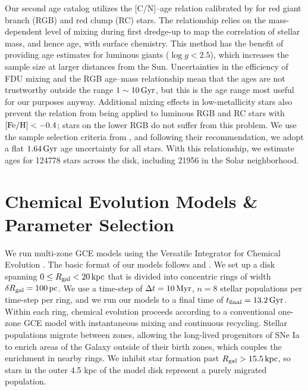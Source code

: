 \documentclass[twocolumn,twocolappendix,linenumbers]{aastex631}
\newcommand{\mathFeH}{{\rm [Fe/H]}}
\newcommand{\kpc}{\,{\rm kpc}}
\newcommand{\Gyr}{\,{\rm Gyr}}
\begin{document}
Our second age catalog utilizes the [C/N]--age relation calibrated by \citet{roberts_cn_2025} for red giant branch (RGB) and red clump (RC) stars. The relationship relies on the mass-dependent level of mixing during first dredge-up \citep[FDU;][]{iben_stellar_1967} to map the correlation of stellar mass, and hence age, with surface chemistry. This method has the benefit of providing age estimates for luminous giants ($\log g<2.5$), which increases the sample size at larger distances from the Sun. Uncertainties in the efficiency of FDU mixing and the RGB age--mass relationship mean that the ages are not trustworthy outside the range $1\sim10\Gyr$, but this is the age range most useful for our purposes anyway. Additional mixing effects in low-metallicity stars also prevent the relation from being applied to luminous RGB and RC stars with $\mathFeH<-0.4$; stars on the lower RGB do not suffer from this problem. 
We use the sample selection criteria from \citet{roberts_cn_2025}, and following their recommendation, we adopt a flat $1.64\Gyr$ age uncertainty for all stars.
With this relationship, we estimate ages for \num{124778} stars across the disk, including \num{21956} in the Solar neighborhood.

\section{Chemical Evolution Models \& Parameter Selection}
\label{sec:methods}

We run multi-zone GCE models using the Versatile Integrator for Chemical Evolution \citep[{\tt VICE};][]{johnson_impact_2020}. The basic format of our models follows \citet{johnson_stellar_2021} and \citet{dubay_galactic_2024}. We set up a disk spanning $0\leq R_{\rm gal}<20\kpc$ that is divided into concentric rings of width $\delta R_{\rm gal}=100\,{\rm pc}$. We use a time-step of $\Delta t=10\,{\rm Myr}$, $n=8$ stellar populations per time-step per ring, and we run our models to a final time of $t_{\rm final}=13.2\,{\rm Gyr}$. Within each ring, chemical evolution proceeds according to a conventional one-zone GCE model with instantaneous mixing and continuous recycling. Stellar populations migrate between zones, allowing the long-lived progenitors of SNe Ia to enrich areas of the Galaxy outside of their birth zones, which couples the enrichment in nearby rings. We inhibit star formation past $R_{\rm gal}>15.5\kpc$, so stars in the outer 4.5 kpc of the model disk represent a purely migrated population.
\end{document}
